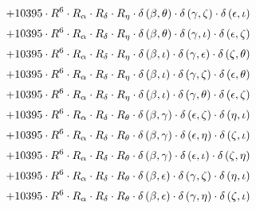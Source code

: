 \begin{subequations}
\begin{gather}
 \\[0.2em] \notag 		 + 10395 \cdot R^{6} \cdot R_{\alpha{}} \cdot R_{\delta{}} \cdot R_{\eta{}} \cdot \delta{}\left(\beta{}, \theta{}\right) \cdot \delta{}\left(\gamma{}, \zeta{}\right) \cdot \delta{}\left(\epsilon{}, \iota{}\right) 
 \\[0.2em] \notag 		 + 10395 \cdot R^{6} \cdot R_{\alpha{}} \cdot R_{\delta{}} \cdot R_{\eta{}} \cdot \delta{}\left(\beta{}, \theta{}\right) \cdot \delta{}\left(\gamma{}, \iota{}\right) \cdot \delta{}\left(\epsilon{}, \zeta{}\right) 
 \\[0.2em] \notag 		 + 10395 \cdot R^{6} \cdot R_{\alpha{}} \cdot R_{\delta{}} \cdot R_{\eta{}} \cdot \delta{}\left(\beta{}, \iota{}\right) \cdot \delta{}\left(\gamma{}, \epsilon{}\right) \cdot \delta{}\left(\zeta{}, \theta{}\right) 
 \\[0.2em] \notag 		 + 10395 \cdot R^{6} \cdot R_{\alpha{}} \cdot R_{\delta{}} \cdot R_{\eta{}} \cdot \delta{}\left(\beta{}, \iota{}\right) \cdot \delta{}\left(\gamma{}, \zeta{}\right) \cdot \delta{}\left(\epsilon{}, \theta{}\right) 
 \\[0.2em] \notag 		 + 10395 \cdot R^{6} \cdot R_{\alpha{}} \cdot R_{\delta{}} \cdot R_{\eta{}} \cdot \delta{}\left(\beta{}, \iota{}\right) \cdot \delta{}\left(\gamma{}, \theta{}\right) \cdot \delta{}\left(\epsilon{}, \zeta{}\right) 
 \\[0.2em] \notag 		 + 10395 \cdot R^{6} \cdot R_{\alpha{}} \cdot R_{\delta{}} \cdot R_{\theta{}} \cdot \delta{}\left(\beta{}, \gamma{}\right) \cdot \delta{}\left(\epsilon{}, \zeta{}\right) \cdot \delta{}\left(\eta{}, \iota{}\right) 
 \\[0.2em] \notag 		 + 10395 \cdot R^{6} \cdot R_{\alpha{}} \cdot R_{\delta{}} \cdot R_{\theta{}} \cdot \delta{}\left(\beta{}, \gamma{}\right) \cdot \delta{}\left(\epsilon{}, \eta{}\right) \cdot \delta{}\left(\zeta{}, \iota{}\right) 
 \\[0.2em] \notag 		 + 10395 \cdot R^{6} \cdot R_{\alpha{}} \cdot R_{\delta{}} \cdot R_{\theta{}} \cdot \delta{}\left(\beta{}, \gamma{}\right) \cdot \delta{}\left(\epsilon{}, \iota{}\right) \cdot \delta{}\left(\zeta{}, \eta{}\right) 
 \\[0.2em] \notag 		 + 10395 \cdot R^{6} \cdot R_{\alpha{}} \cdot R_{\delta{}} \cdot R_{\theta{}} \cdot \delta{}\left(\beta{}, \epsilon{}\right) \cdot \delta{}\left(\gamma{}, \zeta{}\right) \cdot \delta{}\left(\eta{}, \iota{}\right) 
 \\[0.2em] \notag 		 + 10395 \cdot R^{6} \cdot R_{\alpha{}} \cdot R_{\delta{}} \cdot R_{\theta{}} \cdot \delta{}\left(\beta{}, \epsilon{}\right) \cdot \delta{}\left(\gamma{}, \eta{}\right) \cdot \delta{}\left(\zeta{}, \iota{}\right) 

\end{gather}
\end{subequations}
